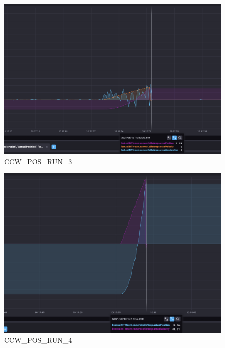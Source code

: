 \documentclass[SE,lsstdraft,authoryear,toc]{lsstdoc}
\begin{document}
\begin{figure}
  \includegraphics[width=\linewidth]{media/ccw_pos_3.png}
  \caption{CCW\_POS\_RUN\_3}
  \label{fig:CCW_POS_RUN_3}
\end{figure}
\newpage
\begin{figure}
  \includegraphics[width=\linewidth]{media/ccw_pos_4.png}
  \caption{CCW\_POS\_RUN\_4}
  \label{fig:CCW_POS_RUN_4}
\end{figure}
\newpage
\end{document}
